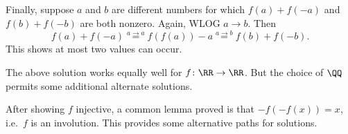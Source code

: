\documentclass[11pt]{scrartcl}
\begin{document}
Finally, suppose $a$ and $b$ are different numbers for which
$f(a)+f(-a)$ and $f(b)+f(-b)$ are both nonzero.
Again, WLOG $a \to b$.
Then
\[ f(a) + f(-a) \overset{a \to a}{=} f(f(a))-a \overset{a \to b}{=} f(b) + f(-b). \]
This shows at most two values can occur.

\begin{remark*}
  The above solution works equally well for $f \colon \RR \to \RR$.
  But the choice of $\QQ$ permits some additional alternate solutions.
\end{remark*}

\begin{remark*}
  After showing $f$ injective,
  a common lemma proved is that $-f(-f(x)) = x$, i.e.\ $f$ is an involution.
  This provides some alternative paths for solutions.
\end{remark*}
\pagebreak
\end{document}

